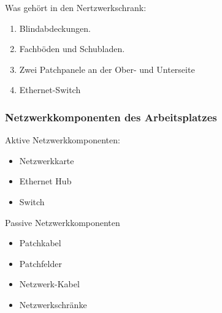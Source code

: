 Was gehört in den Nertzwerkschrank:
\begin{enumerate}[noitemsep]
\item Blindabdeckungen.
\item Fachböden und Schubladen.
\item Zwei Patchpanele an der Ober- und Unterseite 
\item Ethernet-Switch
\end{enumerate}

\subsubsection{Netzwerkkomponenten des Arbeitsplatzes}\label{Netzwerkomponenten}

Aktive Netzwerkkomponenten:
\begin{itemize}[noitemsep]
\item Netzwerkkarte
\item Ethernet Hub
\item Switch
\end{itemize}

Passive Netzwerkkomponenten
\begin{itemize}[noitemsep]
\item Patchkabel
\item Patchfelder
\item Netzwerk-Kabel
\item Netzwerkschränke
\end{itemize}



